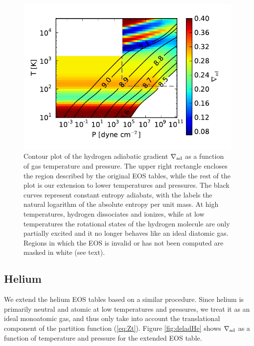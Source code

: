\documentclass[apj]{emulateapj}
\newcommand{\delad}{\nabla_{\rm ad}}
\begin{document}
\begin{enumerate}

\end{enumerate}

\begin{figure}[h!]
\centering
\includegraphics[scale=.8]{../../figs/ModelAtmospheres/RadSelfGravRealEOS/PaperFigs/delad_S_H.pdf}
\caption{Contour plot of the hydrogen adiabatic gradient $\delad$ as a function of gas temperature and pressure. The upper right rectangle encloses the region described by the original \citet{saumon95} EOS tables, while the rest of the plot is our extension to lower temperatures and pressures. The black curves represent constant entropy adiabats, with the labels the natural logarithm of the absolute entropy per unit mass. At high temperatures, hydrogen dissociates and ionizes, while at low temperatures the rotational states of the hydrogen molecule are only partially excited and it no longer behaves like an ideal diatomic gas. Regions in which the EOS is invalid or has not been computed are masked in white (see text).}
\label{fig:deladH}
\end{figure}

\subsection{Helium}

We extend the helium EOS tables based on a similar procedure. Since helium is primarily neutral and atomic at low temperatures and pressures, we treat it as an ideal monoatomic gas, and thus only take into account the translational component of the partition function (\ref{eq:Zt}). Figure \ref{fig:deladHe} shows $\delad$ as a function of temperature and pressure for the extended EOS table. %
\end{document}
